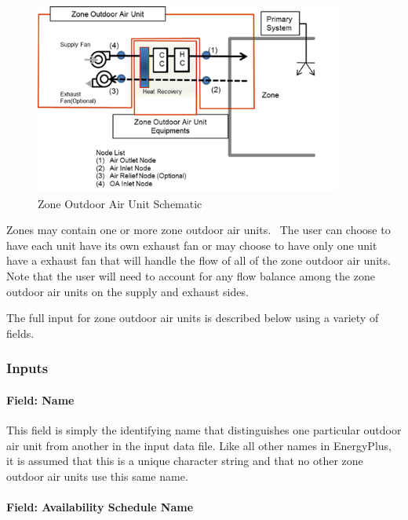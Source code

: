 \begin{figure}[hbtp] %
\centering
\includegraphics[width=0.9\textwidth, height=0.9\textheight, keepaspectratio=true]{media/image282.png}
\caption{Zone Outdoor Air Unit Schematic \protect \label{fig:zone-outdoor-air-unit-schematic}}
\end{figure}

Zones may contain one or more zone outdoor air units.~ The user can choose to have each unit have its own exhaust fan or may choose to have only one unit have a exhaust fan that will handle the flow of all of the zone outdoor air units.~ Note that the user will need to account for any flow balance among the zone outdoor air units on the supply and exhaust sides.

The full input for zone outdoor air units is described below using a variety of fields.

\subsubsection{Inputs}\label{inputs-5-035}

\paragraph{Field: Name}\label{field-name-5-029}

This field is simply the identifying name that distinguishes one particular outdoor air unit from another in the input data file. Like all other names in EnergyPlus, it is assumed that this is a unique character string and that no other zone outdoor air units use this same name.

\paragraph{Field: Availability Schedule Name}\label{field-availability-schedule-name-5-005}

